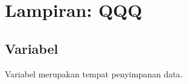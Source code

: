 \chapter{Lampiran: QQQ}\label{ch:app2}
\section{Variabel}
Variabel merupakan tempat penyimpanan data. 

